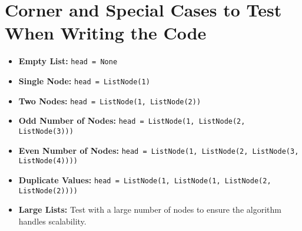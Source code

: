 \section*{Corner and Special Cases to Test When Writing the Code}
\begin{itemize}
    \item \textbf{Empty List:} \texttt{head = None}
    \item \textbf{Single Node:} \texttt{head = ListNode(1)}
    \item \textbf{Two Nodes:} \texttt{head = ListNode(1, ListNode(2))}
    \item \textbf{Odd Number of Nodes:} \texttt{head = ListNode(1, ListNode(2, ListNode(3)))}
    \item \textbf{Even Number of Nodes:} \texttt{head = ListNode(1, ListNode(2, ListNode(3, ListNode(4))))}
    \item \textbf{Duplicate Values:} \texttt{head = ListNode(1, ListNode(1, ListNode(2, ListNode(2))))}
    \item \textbf{Large Lists:} Test with a large number of nodes to ensure the algorithm handles scalability.
\end{itemize}

\printindex